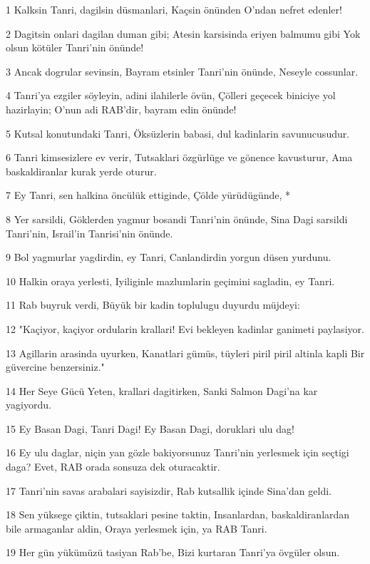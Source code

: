 \par 1 Kalksin Tanri, dagilsin düsmanlari, Kaçsin önünden O'ndan nefret edenler!
\par 2 Dagitsin onlari dagilan duman gibi; Atesin karsisinda eriyen balmumu gibi Yok olsun kötüler Tanri'nin önünde!
\par 3 Ancak dogrular sevinsin, Bayram etsinler Tanri'nin önünde, Neseyle cossunlar.
\par 4 Tanri'ya ezgiler söyleyin, adini ilahilerle övün, Çölleri geçecek biniciye yol hazirlayin; O'nun adi RAB'dir, bayram edin önünde!
\par 5 Kutsal konutundaki Tanri, Öksüzlerin babasi, dul kadinlarin savunucusudur.
\par 6 Tanri kimsesizlere ev verir, Tutsaklari özgürlüge ve gönence kavusturur, Ama baskaldiranlar kurak yerde oturur.
\par 7 Ey Tanri, sen halkina öncülük ettiginde, Çölde yürüdügünde, *
\par 8 Yer sarsildi, Göklerden yagmur bosandi Tanri'nin önünde, Sina Dagi sarsildi Tanri'nin, Israil'in Tanrisi'nin önünde.
\par 9 Bol yagmurlar yagdirdin, ey Tanri, Canlandirdin yorgun düsen yurdunu.
\par 10 Halkin oraya yerlesti, Iyiliginle mazlumlarin geçimini sagladin, ey Tanri.
\par 11 Rab buyruk verdi, Büyük bir kadin toplulugu duyurdu müjdeyi:
\par 12 "Kaçiyor, kaçiyor ordularin krallari! Evi bekleyen kadinlar ganimeti paylasiyor.
\par 13 Agillarin arasinda uyurken, Kanatlari gümüs, tüyleri piril piril altinla kapli Bir güvercine benzersiniz."
\par 14 Her Seye Gücü Yeten, krallari dagitirken, Sanki Salmon Dagi'na kar yagiyordu.
\par 15 Ey Basan Dagi, Tanri Dagi! Ey Basan Dagi, doruklari ulu dag!
\par 16 Ey ulu daglar, niçin yan gözle bakiyorsunuz Tanri'nin yerlesmek için seçtigi daga? Evet, RAB orada sonsuza dek oturacaktir.
\par 17 Tanri'nin savas arabalari sayisizdir, Rab kutsallik içinde Sina'dan geldi.
\par 18 Sen yüksege çiktin, tutsaklari pesine taktin, Insanlardan, baskaldiranlardan bile armaganlar aldin, Oraya yerlesmek için, ya RAB Tanri.
\par 19 Her gün yükümüzü tasiyan Rab'be, Bizi kurtaran Tanri'ya övgüler olsun.

